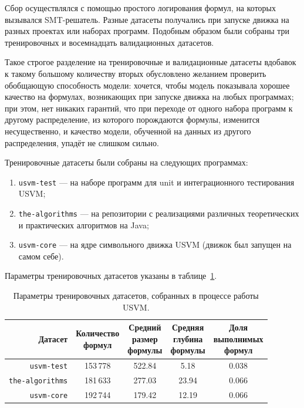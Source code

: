 Сбор осуществлялся с помощью простого логирования формул, на которых вызывался SMT-решатель. Разные датасеты получались при запуске движка на разных проектах или наборах программ. Подобным образом были собраны три тренировочных и восемнадцать валидационных датасетов.

Такое строгое разделение на тренировочные и валидационные датасеты вдобавок к такому большому количеству вторых обусловлено желанием проверить обобщающую способность модели: хочется, чтобы модель показывала хорошее качество на формулах, возникающих при запуске движка на любых программах; при этом, нет никаких гарантий, что при переходе от одного набора программ к другому распределение, из которого порождаются формулы, изменится несущественно, и качество модели, обученной на данных из другого распределения, упадёт не слишком сильно.

Тренировочные датасеты были собраны на следующих программах:

\begin{enumerate}
    \item \texttt{usvm-test} --- на наборе программ для unit и интеграционного тестирования USVM;
    \item \texttt{the-algorithms} --- на репозитории с реализациями различных теоретических и практических алгоритмов на Java;
    \item \texttt{usvm-core} --- на ядре символьного движка USVM (движок был запущен на самом себе).
\end{enumerate}

Параметры тренировочных датасетов указаны в таблице~\ref{usvm-train-datasets-table}.

\begin{table}[ht]
\begin{center}
\begin{tabular}{r|cccc}
    Датасет & \makecell{Количество \\ формул} & \makecell{Средний \\ размер \\ формулы} & \makecell{Средняя \\ глубина \\ формулы} & \makecell{Доля \\ выполнимых \\ формул} \\
    \hline \hline
    \rule{0pt}{2.5ex}
    \texttt{usvm-test}      & 153\,778 & 522.84 &  5.18 & 0.038 \\
    \texttt{the-algorithms} & 181\,633 & 277.03 & 23.94 & 0.066 \\
    \texttt{usvm-core}      & 192\,744 & 179.42 & 12.19 & 0.066 \\
\end{tabular}
\caption{\label{usvm-train-datasets-table} Параметры тренировочных датасетов, собранных в процессе работы USVM.}
\end{center}
\end{table}


